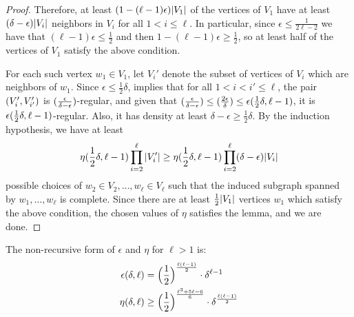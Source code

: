 \begin{lemma}
\begin{proof}
                Therefore, at least $(1 - (\ell -1) \epsilon) | V_1 |$ of the vertices of $V_1$ have at least
                $(\delta - \epsilon) | V_i |$ neighbors in $V_i$ for all $1 < i \leq \ell$.
                In particular, since $\epsilon \leq \frac{1}{2\ell - 2}$ we have that $(\ell - 1) \epsilon \leq \frac{1}{2}$
                and then $1 - (\ell - 1) \epsilon \geq \frac{1}{2}$, so at least half of the vertices of $V_1$ satisfy the
                above condition.

                For each such vertex $w_1 \in V_1$, let $V_i'$ denote the subset of vertices of $V_i$ which are neighbors
                of $w_1$.
                Since $\epsilon \leq \frac{1}{2}\delta$,  implies that for all
                $1 < i < i' \leq \ell$, the pair $( V_i', V_{i'}' )$ is $( \frac{\epsilon}{\delta-\epsilon} )$-regular,
                and given that $( \frac{\epsilon}{\delta-\epsilon} ) \leq ( \frac{2\epsilon}{\delta} ) \leq \epsilon( \frac{1}{2}\delta, \ell-1 )$,
                it is $\epsilon( \frac{1}{2}\delta, \ell-1 )$-regular.
                Also, it has density at least $\delta - \epsilon \geq \frac{1}{2} \delta$.
                By the induction hypothesis, we have at least
                \[
                    \eta ( \frac{1}{2}\delta, \ell-1 ) \prod_{i=2}^\ell | V_i' |
                        \geq \eta ( \frac{1}{2}\delta, \ell-1 ) \prod_{i=2}^\ell ( \delta - \epsilon ) | V_i |
                \]
                possible choices of $w_2 \in V_2, \dots, w_\ell \in V_\ell$ such that the induced subgraph spanned by
                $w_1, \dots, w_\ell$ is complete.
                Since there are at least $\frac{1}{2} | V_1 |$ vertices $w_1$ which satisfy the above condition,
                the chosen values of $\eta$ satisfies the lemma, and we are done.
            \end{proof}
        \end{lemma}

        \begin{remark}
            The non-recursive form of $\epsilon$ and $\eta$ for $\ell > 1$ is:
            \begin{align*}
                \epsilon(\delta, \ell) & = \Bigl( \frac{1}{2} \Bigr)^{\frac{\ell(\ell-1)}{2}} \cdot \delta^{\ell-1} \\
                \eta(\delta, \ell) & \geq \Bigl( \frac{1}{2} \Bigr)^{\frac{\ell^3+5\ell-6}{6}} \cdot \delta^{\frac{\ell(\ell-1)}{2}}
            \end{align*}
        \end{remark}


